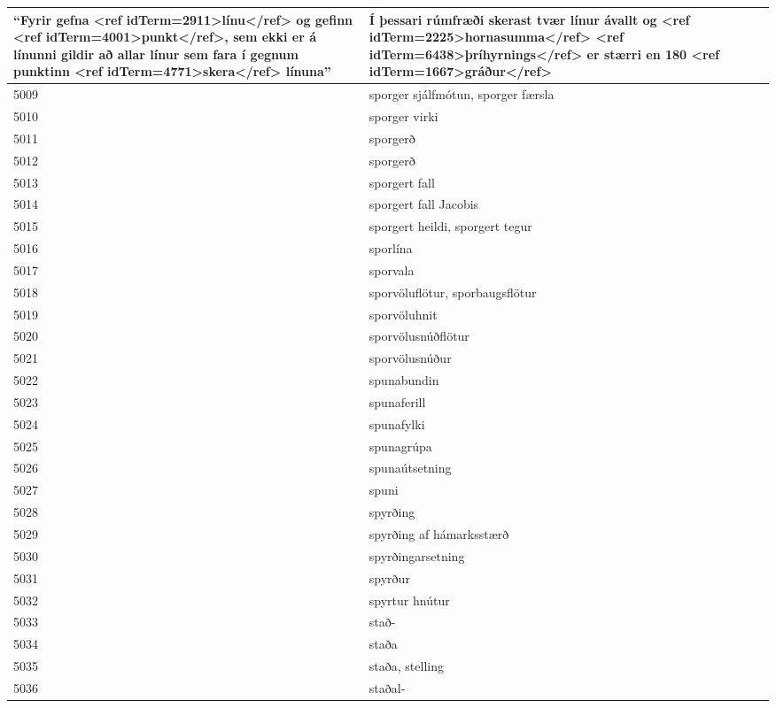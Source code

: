 \begin{longtable}{p{}|p{}|p{}|p{}|p{}}
``Fyrir gefna <ref idTerm=2911>línu</ref> og gefinn <ref idTerm=4001>punkt</ref>,
sem ekki er á línunni gildir að allar línur sem fara í gegnum punktinn <ref idTerm=4771>skera</ref> línuna'' & Í þessari rúmfræði skerast tvær línur ávallt og <ref idTerm=2225>hornasumma</ref> <ref idTerm=6438>þríhyrnings</ref> er stærri en 180 <ref idTerm=1667>gráður</ref> &  &  \\
\hline
5009 & sporger sjálfmótun, sporger færsla &  &  &  \\
\hline
5010 & sporger virki &  &  &  \\
\hline
5011 & sporgerð &  &  &  \\
\hline
5012 & sporgerð &  &  &  \\
\hline
5013 & sporgert fall &  &  &  \\
\hline
5014 & sporgert fall Jacobis &  &  &  \\
\hline
5015 & sporgert heildi, sporgert tegur &  &  &  \\
\hline
5016 & sporlína &  &  &  \\
\hline
5017 & sporvala &  &  &  \\
\hline
5018 & sporvöluflötur, sporbaugsflötur &  &  &  \\
\hline
5019 & sporvöluhnit &  &  &  \\
\hline
5020 & sporvölusnúðflötur &  &  &  \\
\hline
5021 & sporvölusnúður &  &  &  \\
\hline
5022 & spunabundin &  &  &  \\
\hline
5023 & spunaferill &  &  &  \\
\hline
5024 & spunafylki &  &  &  \\
\hline
5025 & spunagrúpa &  &  &  \\
\hline
5026 & spunaútsetning &  &  &  \\
\hline
5027 & spuni &  &  &  \\
\hline
5028 & spyrðing &  &  &  \\
\hline
5029 & spyrðing af hámarksstærð &  &  &  \\
\hline
5030 & spyrðingarsetning &  &  &  \\
\hline
5031 & spyrður &  &  &  \\
\hline
5032 & spyrtur hnútur &  &  &  \\
\hline
5033 & stað- &  &  &  \\
\hline
5034 & staða &  &  &  \\
\hline
5035 & staða, stelling &  &  &  \\
\hline
5036 & staðal- &  &  &  \\

\end{longtable}
